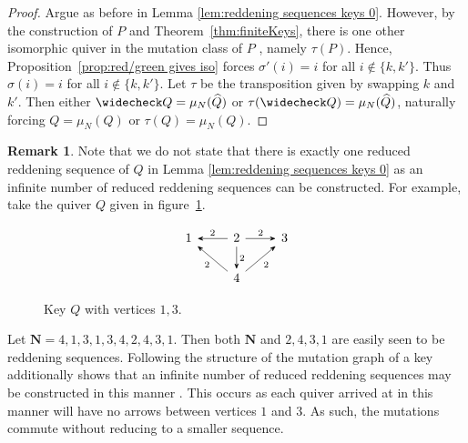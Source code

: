 \documentclass[11pt, letterpaper]{amsart}
\theoremstyle{definition}
\newtheorem{remark}[theorem]{Remark}
\numberwithin{equation}{section}
\begin{document}
\begin{proof}
    Argue as before in Lemma \ref{lem:reddening sequences keys 0}.
    However, by the construction of $P$ and Theorem~\ref{thm:finiteKeys}, there is one other isomorphic quiver in the mutation class of $P$ \cite{MR4695532}, namely $\tau(P)$.
    Hence, Proposition~\ref{prop:red/green gives iso} forces $\sigma'(i) = i$ for all $i \notin \{k,k'\}$.
    Thus $\sigma(i) = i$ for all $i \notin \{k,k'\}$.
    Let $\tau$ be the transposition given by swapping $k$ and $k'$.
    Then either $\widecheck Q = \mu_N(\widehat Q)$ or $\tau(\widecheck Q)  = \mu_N(\widehat Q)$, naturally forcing $Q = \mu_N(Q)$ or $\tau(Q) = \mu_N(Q)$.
\end{proof}

\begin{remark} \label{rmk:reddening sequences keys}
    Note that we do not state that there is exactly one reduced reddening sequence of $Q$ in Lemma \ref{lem:reddening sequences keys 0} as an infinite number of reduced reddening sequences can be constructed. 
    For example, take the quiver $Q$ given in figure~\ref{fig:infinite reduced example}.
    \begin{figure}[ht]
        \centering
        \[\begin{tikzcd}[every arrow/.append style = {-{Stealth}}]
            1 & 2 & 3 \\
            & 4 
            \arrow[from=1-2,to=1-1,"2"']
            \arrow[from=1-2,to=1-3,"2"]
            \arrow[from=2-2,to=1-1,"2"]
            \arrow[from=1-2,to=2-2,"2"]
            \arrow[from=2-2,to=1-3,"2"']
        \end{tikzcd}\]
        \caption{Key $Q$ with vertices $1,3$.} %
        \label{fig:infinite reduced example}
    \end{figure}
    Let ${\mathbf{N} = 4,1,3,1,3,4,2,4,3,1}$.
    Then both $\mathbf{N}$ and $2,4,3,1$ are easily seen to be reddening sequences.
    Following the structure of the mutation graph of a key additionally shows that an infinite number of reduced reddening sequences may be constructed in this manner \cite{MR4695532}. 
    This occurs as each quiver arrived at in this manner will have no arrows between vertices $1$ and $3$.
    As such, the mutations commute without reducing to a smaller sequence.
\end{remark}
\end{document}
